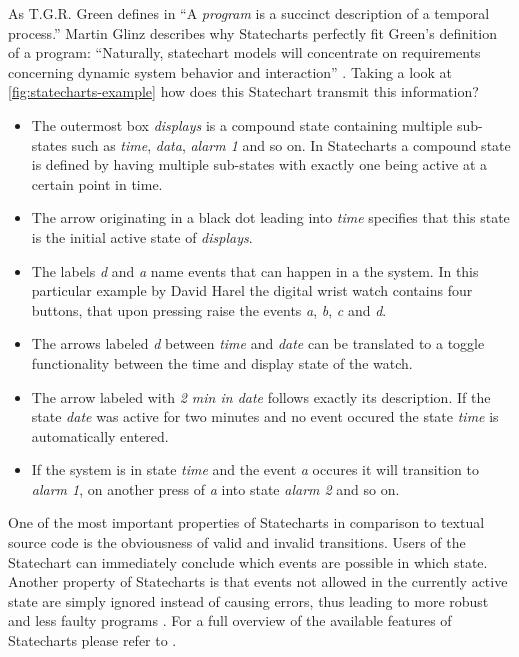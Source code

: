 As T.G.R. Green defines in \textcite[3]{green_pictures_1982} ``A \emph{program} is a succinct description of a temporal process.''
Martin Glinz describes why Statecharts perfectly fit Green's definition of a program: ``Naturally, statechart models will concentrate on requirements concerning dynamic system behavior and interaction'' \autocite[1]{glinz_statecharts_2002}.
Taking a look at \cref{fig:statecharts-example} how does this Statechart transmit this information?
\begin{itemize}
    \item The outermost box \emph{displays} is a compound state containing multiple sub-states such as \emph{time}, \emph{data}, \emph{alarm 1} and so on. In Statecharts a compound state is defined by having multiple sub-states with exactly one being active at a certain point in time.
    \item The arrow originating in a black dot leading into \emph{time} specifies that this state is the initial active state of \emph{displays}.
    \item The labels \emph{d} and \emph{a} name events that can happen in a the system. In this particular example by David Harel the digital wrist watch contains four buttons, that upon pressing raise the events \emph{a}, \emph{b}, \emph{c} and \emph{d}.
    \item The arrows labeled \emph{d} between \emph{time} and \emph{date} can be translated to a toggle functionality between the time and display state of the watch.
    \item The arrow labeled with \emph{2 min in date} follows exactly its description. If the state \emph{date} was active for two minutes and no event occured the state \emph{time} is automatically entered.
    \item If the system is in state \emph{time} and the event \emph{a} occures it will transition to \emph{alarm 1}, on another press of \emph{a} into state \emph{alarm 2} and so on.
\end{itemize}

One of the most important properties of Statecharts in comparison to textual source code is the obviousness of valid and invalid transitions.
Users of the Statechart can immediately conclude which events are possible in which state.
Another property of Statecharts is that events not allowed in the currently active state are simply ignored instead of causing errors, thus leading to more robust and less faulty programs \autocite{horrocks_constructing_1999}.
For a full overview of the available features of Statecharts please refer to \textcite{harel_statecharts:_1987}.

